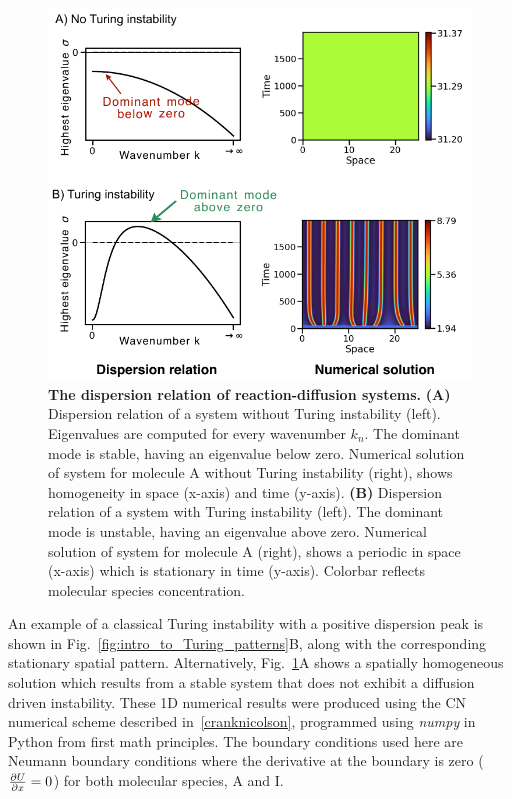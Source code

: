 \begin{figure}[H] %
    \centering
    \includegraphics[width=1\textwidth]{chapters/Chapter 1/turing_vs_noturing} %
    \caption{\textbf{The dispersion relation of reaction-diffusion systems.} \textbf{(A)} Dispersion relation of a system without Turing instability (left). Eigenvalues are computed for every wavenumber $k_{n}$. The dominant mode is stable, having an eigenvalue below zero. Numerical solution of system for molecule A without Turing instability (right), shows homogeneity in space (x-axis) and time (y-axis).  \textbf{(B)} Dispersion relation of a system with Turing instability (left). The dominant mode is unstable, having an eigenvalue above zero. Numerical solution of system for molecule A (right), shows a periodic in space (x-axis) which is stationary in time (y-axis). Colorbar reflects molecular species concentration.}
    \label{fig:turing_vs_noturing} %
\end{figure}
An example of a classical Turing instability with a positive dispersion peak is shown in Fig.~\ref{fig:intro_to_Turing_patterns}B, along with the corresponding stationary spatial pattern.
Alternatively, Fig.~\ref{fig:turing_vs_noturing}A shows a spatially homogeneous solution which results from a stable system that does not exhibit a diffusion driven instability.
These 1D numerical results were produced using the \acrfull{CN} numerical scheme described in~\ref{cranknicolson}, programmed using \textit{numpy} in Python from first math principles.
The boundary conditions used here are Neumann boundary conditions where the derivative at the boundary is zero ($\pdv{U}{x}=0$) for both molecular species, A and I.

